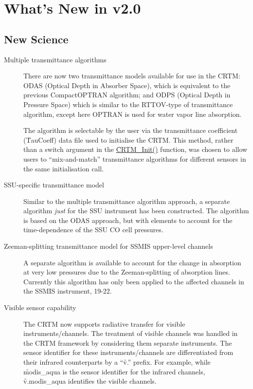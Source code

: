 \chapter*{What's New in v2.0}

\section*{New Science}

\begin{description}
\item[Multiple transmittance algorithms] There are now two transmittance models available for use in the CRTM: ODAS (Optical Depth in Absorber Space), which is equivalent to the previous CompactOPTRAN algorithm; and ODPS (Optical Depth in Pressure Space) which is similar to the RTTOV-type of transmittance algorithm, except here OPTRAN is used for water vapor line absorption.

The algorithm is selectable by the user via the transmittance coefficient (\f{TauCoeff}) data file used to initialise the CRTM. This method, rather than a switch argument in the \hyperref[sec:CRTM_Init_interface]{\f{CRTM\_Init()}} function, was chosen to allow users to ``mix-and-match'' transmittance algorithms for different sensors in the same initialisation call.

\item[SSU-specific transmittance model] Similar to the multiple transmittance algorithm approach, a separate algorithm \emph{just} for the SSU instrument has been constructed. The algorithm is based on the ODAS approach, but with elements to account for the time-dependence of the SSU CO cell pressures.

\item[Zeeman-splitting transmittance model for SSMIS upper-level channels] A separate algorithm is available to account for the change in absorption at very low pressures due to the Zeeman-splitting of absorption lines. Currently this algorithm has only been applied to the affected channels in the SSMIS instrument, 19-22.

\item[Visible sensor capability] The CRTM now supports radiative transfer for visible instruments/channels. The treatment of visible channels was handled in the CRTM framework by considering them separate instruments. The sensor identifier for these instruments/channels are differentiated from their infrared counterparts by a ``\f{v.}'' prefix. For example, while \f{modis\_aqua} is the sensor identifier for the infrared channels, \f{v.modis\_aqua} identifies the visible channels.


\end{description}

